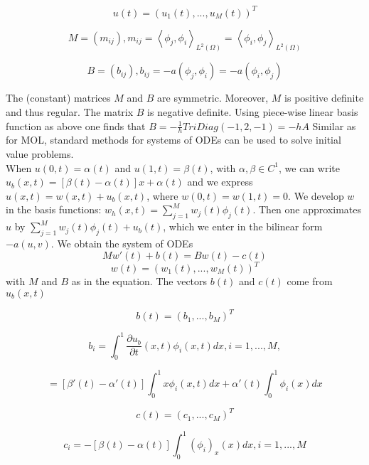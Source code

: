 \documentclass{article}
\begin{document}
$$
u(t) = (u_1(t),...,u_M(t))^T
$$

$$
M = (m_{ij}), m_{ij} = \left \langle \phi_j,\phi_i \right \rangle_{L^2(\Omega)} = \left \langle \phi_i,\phi_j \right \rangle_{L^2(\Omega)}
$$

$$
B = (b_{ij}), b_{ij} = -a(\phi_j,\phi_i) = -a(\phi_i,\phi_j) 
$$

The (constant) matrices $M$ and $B$ are symmetric. Moreover, $M$ is positive definite and thus regular. The matrix $B$ is negative definite. Using piece-wise linear basis function as above one finds that $B = -\frac{1}{h}TriDiag(-1,2,-1) = -hA$
Similar as for MOL, standard methods for systems of ODEs can be used  to solve initial value problems.\\
When $u(0,t) = \alpha(t)$ and $u(1,t)=\beta(t)$, with $\alpha,\beta \in C^1$, we can write $u_b(x,t) = [\beta(t) - \alpha(t)]x + \alpha(t)$ and we express $u(x,t) = w(x,t)+u_b(x,t)$, where $w(0,t) = w(1,t) = 0$. We develop $w$ in the basis functions: $w_h(x,t) = \sum_{j=1}^M w_j(t)\phi_j(t)$. Then one approximates $u$ by $\sum_{j=1}^M w_j(t)\phi_j(t) + u_b(t)$, which we enter in the bilinear form $-a(u,v)$. We obtain the system of ODEs
$$
Mw'(t) + b(t) = Bw(t) - c(t)
$$
$$
w(t) = (w_1(t), ... ,w_M(t))^T
$$
with $M$ and $B$ as in the equation. The vectors $b(t)$ and $c(t)$ come from $u_b(x,t)$

$$
b(t) = (b_1,...,b_M)^T
$$

$$
b_i = \int_0^1 \frac{\partial u_b}{\partial t}(x,t)\phi_i(x,t)dx, i = 1,...,M,
$$

$$
=[\beta'(t)-\alpha'(t)]\int_0^1 x\phi_i(x,t)dx + \alpha'(t)\int_0^1 \phi_i(x)dx
$$

$$
c(t) = (c_1,...,c_M)^T
$$

$$
c_i = -[\beta (t)-\alpha(t)]\int_0^1(\phi_i)_x(x)dx, i =1,...,M
$$
\end{document}

